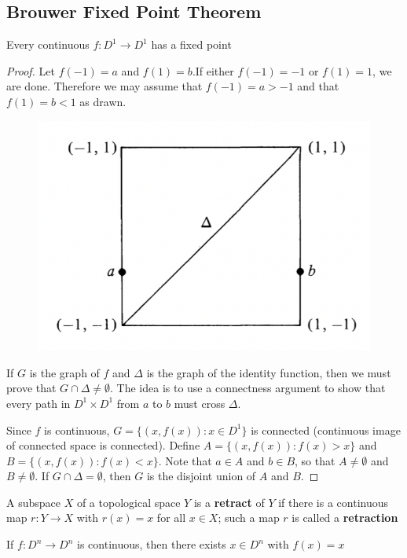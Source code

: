 \documentclass[11pt]{article}
\begin{document}
\subsection{Brouwer Fixed Point Theorem}
\label{sec:orgd64084c}
\begin{theorem}[]
Every continuous \(f:D^1\to D^1\) has a fixed point
\end{theorem}

\begin{proof}
Let \(f(-1)=a\) and \(f(1)=b\).If either \(f(-1)=-1\) or \(f(1)=1\), we are done. Therefore we
may assume that \(f(-1)=a>-1\) and that \(f(1)=b<1\) as drawn.
\begin{figure}[htbp]
\centering
\includegraphics[width=.5\textwidth]{../images/AnIntroductionToAlgebraicTopology/1.png}
\label{}
\end{figure}
If \(G\) is the graph of \(f\) and \(\Delta\) is the graph of the identity function, then we must prove
that \(G\cap\Delta\neq\emptyset\). The idea is to use a connectness argument to show that every path in \(D^1\times D^1\)
from \(a\) to \(b\) must cross \(\Delta\).

Since \(f\) is continuous, \(G=\{(x,f(x)):x\in D^1\}\) is connected (continuous image of connected
space is connected). Define \(A=\{(x,f(x)):f(x)>x\}\)  and \(B=\{(x,f(x)):f(x)<x\}\). Note
that \(a\in A\) and \(b\in B\), so that \(A\neq\emptyset\) and \(B\neq\emptyset\). If \(G\cap\Delta=\emptyset\), then \(G\) is the disjoint
union of \(A\) and \(B\).
\end{proof}

\begin{definition}[]
A subspace \(X\) of a topological space \(Y\) is a \textbf{retract} of \(Y\) if there is a continuous
map  \(r:Y\to X\) with \(r(x)=x\) for all \(x\in X\); such a map \(r\) is called a \textbf{retraction}
\end{definition}



\begin{theorem}
If \(f:D^n\to D^n\) is continuous, then there exists \(x\in D^n\) with \(f(x)=x\)
\end{theorem}
\end{document}
